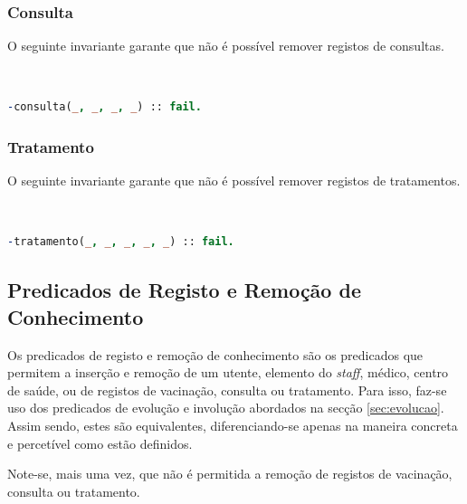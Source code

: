 \documentclass[a4paper, 11pt]{article}
\begin{document}
\subsubsection*{Consulta}

O seguinte invariante garante que não é possível remover registos de consultas.

\

\begin{lstlisting}[language=Prolog, caption={Invariante de remoção relativo ao predicado \texttt{consulta}}]
% Nao permite a remocao de registos de consultas
-consulta(_, _, _, _) :: fail.
\end{lstlisting}

\subsubsection*{Tratamento}

O seguinte invariante garante que não é possível remover registos de tratamentos.

\

\begin{lstlisting}[language=Prolog, caption={Invariante de remoção relativo ao predicado \texttt{tratamento}}]
% Nao permite a remocao de registos de tratamentos
-tratamento(_, _, _, _, _) :: fail.
\end{lstlisting}

\pagebreak

\subsection{Predicados de Registo e Remoção de Conhecimento}

Os predicados de registo e remoção de conhecimento são os predicados que permitem a inserção e remoção de um utente,
elemento do \textit{staff}, médico, centro de saúde, ou de registos de vacinação, consulta ou tratamento. Para isso, faz-se
uso dos predicados de evolução e involução abordados na secção \ref{sec:evolucao}. Assim sendo, estes são equivalentes,
diferenciando-se apenas na maneira concreta e percetível como estão definidos. 

Note-se, mais uma vez, que não é permitida a remoção de registos de vacinação, consulta ou tratamento.

\
\end{document}
